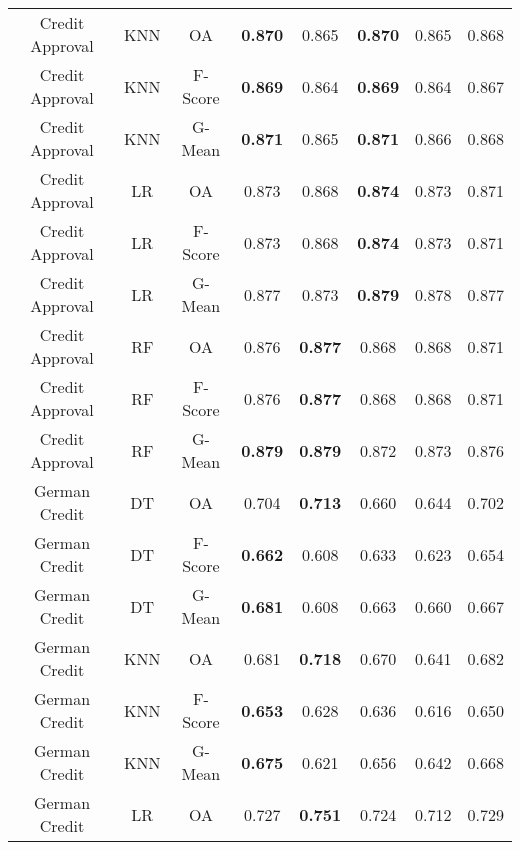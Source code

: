 \begin{longtable}{cccccccc}
Credit Approval &        KNN &      OA & \textbf{0.870} &          0.865 & \textbf{0.870} &          0.865 &          0.868 \\
Credit Approval &        KNN & F-Score & \textbf{0.869} &          0.864 & \textbf{0.869} &          0.864 &          0.867 \\
Credit Approval &        KNN &  G-Mean & \textbf{0.871} &          0.865 & \textbf{0.871} &          0.866 &          0.868 \\
Credit Approval &         LR &      OA &          0.873 &          0.868 & \textbf{0.874} &          0.873 &          0.871 \\
Credit Approval &         LR & F-Score &          0.873 &          0.868 & \textbf{0.874} &          0.873 &          0.871 \\
Credit Approval &         LR &  G-Mean &          0.877 &          0.873 & \textbf{0.879} &          0.878 &          0.877 \\
Credit Approval &         RF &      OA &          0.876 & \textbf{0.877} &          0.868 &          0.868 &          0.871 \\
Credit Approval &         RF & F-Score &          0.876 & \textbf{0.877} &          0.868 &          0.868 &          0.871 \\
Credit Approval &         RF &  G-Mean & \textbf{0.879} & \textbf{0.879} &          0.872 &          0.873 &          0.876 \\
  German Credit &         DT &      OA &          0.704 & \textbf{0.713} &          0.660 &          0.644 &          0.702 \\
  German Credit &         DT & F-Score & \textbf{0.662} &          0.608 &          0.633 &          0.623 &          0.654 \\
  German Credit &         DT &  G-Mean & \textbf{0.681} &          0.608 &          0.663 &          0.660 &          0.667 \\
  German Credit &        KNN &      OA &          0.681 & \textbf{0.718} &          0.670 &          0.641 &          0.682 \\
  German Credit &        KNN & F-Score & \textbf{0.653} &          0.628 &          0.636 &          0.616 &          0.650 \\
  German Credit &        KNN &  G-Mean & \textbf{0.675} &          0.621 &          0.656 &          0.642 &          0.668 \\
  German Credit &         LR &      OA &          0.727 & \textbf{0.751} &          0.724 &          0.712 &          0.729 \\

\end{longtable}
